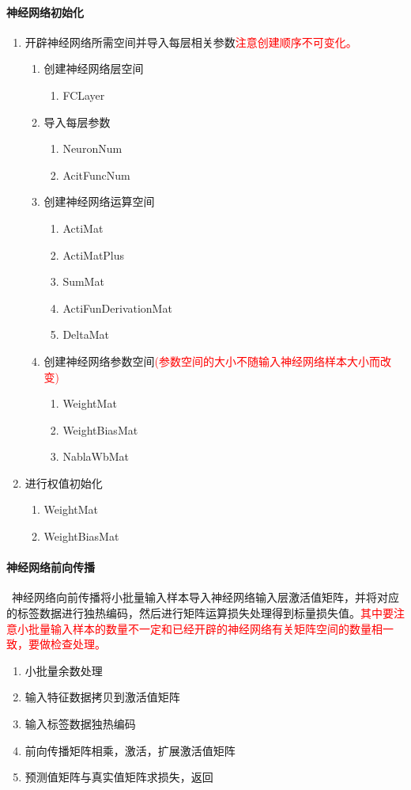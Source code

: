 \paragraph{神经网络初始化}
\begin{enumerate}
  \item 开辟神经网络所需空间并导入每层相关参数\textcolor{red}{注意创建顺序不可变化。}
  \begin{enumerate}[(1)]
    \item 创建神经网络层空间
    \begin{enumerate}[<1>]
      \item FCLayer
    \end{enumerate}
        \item 导入每层参数
    \begin{enumerate}[<1>]
      \item NeuronNum
      \item AcitFuncNum
    \end{enumerate}
    \item 创建神经网络运算空间
    \begin{enumerate}[<1>]
      \item ActiMat
      \item ActiMatPlus
      \item SumMat
      \item ActiFunDerivationMat
      \item DeltaMat
    \end{enumerate}
    \item 创建神经网络参数空间\textcolor{red}{(参数空间的大小不随输入神经网络样本大小而改变)}
    \begin{enumerate}[<1>]
      \item WeightMat
      \item WeightBiasMat
      \item NablaWbMat
    \end{enumerate}
  \end{enumerate}
  \item 进行权值初始化
  \begin{enumerate}
    \item WeightMat
    \item WeightBiasMat
  \end{enumerate}
\end{enumerate}



\paragraph{神经网络前向传播} ~神经网络向前传播将小批量输入样本导入神经网络输入层激活值矩阵，并将对应的标签数据进行独热编码，然后进行矩阵运算损失处理得到标量损失值。\textcolor{red}{其中要注意小批量输入样本的数量不一定和已经开辟的神经网络有关矩阵空间的数量相一致，要做检查处理。}

\begin{enumerate}
  \item 小批量余数处理
  \item 输入特征数据拷贝到激活值矩阵
  \item 输入标签数据独热编码
  \item 前向传播矩阵相乘，激活，扩展激活值矩阵
  \item 预测值矩阵与真实值矩阵求损失，返回
\end{enumerate}


